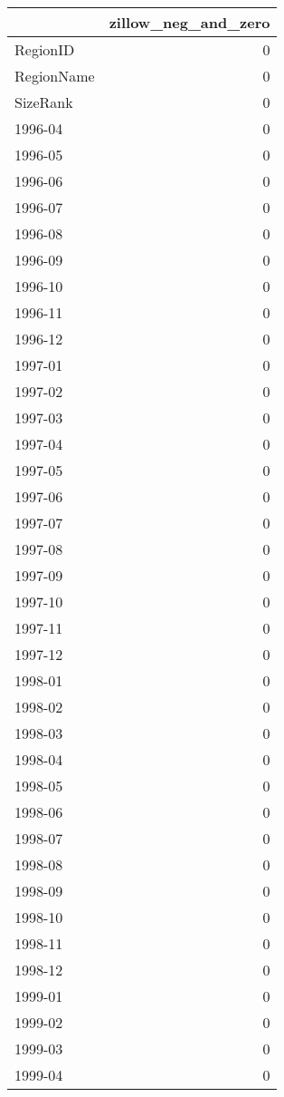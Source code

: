 \documentclass[
]{article}
\begin{document}
\begin{table}[H]
\centering
\begin{tabular}{l|r}
\hline
  & zillow\_neg\_and\_zero\\
\hline
RegionID & 0\\
\hline
RegionName & 0\\
\hline
SizeRank & 0\\
\hline
1996-04 & 0\\
\hline
1996-05 & 0\\
\hline
1996-06 & 0\\
\hline
1996-07 & 0\\
\hline
1996-08 & 0\\
\hline
1996-09 & 0\\
\hline
1996-10 & 0\\
\hline
1996-11 & 0\\
\hline
1996-12 & 0\\
\hline
1997-01 & 0\\
\hline
1997-02 & 0\\
\hline
1997-03 & 0\\
\hline
1997-04 & 0\\
\hline
1997-05 & 0\\
\hline
1997-06 & 0\\
\hline
1997-07 & 0\\
\hline
1997-08 & 0\\
\hline
1997-09 & 0\\
\hline
1997-10 & 0\\
\hline
1997-11 & 0\\
\hline
1997-12 & 0\\
\hline
1998-01 & 0\\
\hline
1998-02 & 0\\
\hline
1998-03 & 0\\
\hline
1998-04 & 0\\
\hline
1998-05 & 0\\
\hline
1998-06 & 0\\
\hline
1998-07 & 0\\
\hline
1998-08 & 0\\
\hline
1998-09 & 0\\
\hline
1998-10 & 0\\
\hline
1998-11 & 0\\
\hline
1998-12 & 0\\
\hline
1999-01 & 0\\
\hline
1999-02 & 0\\
\hline
1999-03 & 0\\
\hline
1999-04 & 0\\

\end{tabular}
\end{table}
\end{document}
